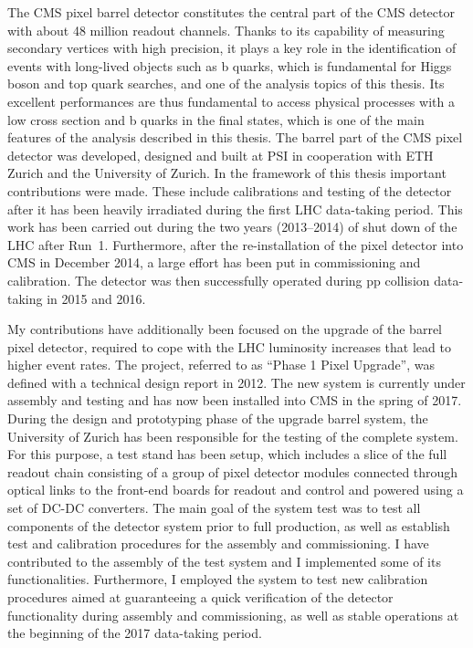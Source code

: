 The CMS pixel barrel detector constitutes the central part of the CMS detector with about 48 million readout channels. Thanks to its capability of measuring secondary vertices with high precision,
it plays a key role in the identification of events with long-lived objects such as b quarks, which is fundamental for Higgs boson and top quark searches, and one of the analysis topics of this thesis.
Its excellent performances are thus fundamental to access physical processes with a low cross section and b quarks in the final states, which is one of the main features of the analysis described in this thesis.
The barrel part of the CMS pixel detector was developed, designed and built at PSI in cooperation with ETH Zurich and the University of Zurich.
In the framework of this thesis important contributions were made. These include calibrations and testing of the detector after it has been heavily irradiated during the first LHC data-taking period.
This work has been carried out during the two years (2013--2014) of shut down of the LHC after Run~1. Furthermore, after the re-installation of the pixel detector into CMS in December 2014,
a large effort has been put in commissioning and calibration. The detector was then successfully operated during pp collision data-taking in 2015 and 2016.

My contributions have additionally been focused on the upgrade of the barrel pixel detector, required to cope with the LHC luminosity increases that lead to higher event rates.
The project, referred to as ``Phase 1 Pixel Upgrade'', was defined with a technical design report in 2012. The new system is currently under assembly and testing and has now been installed into CMS in the spring of 2017.
During the design and prototyping phase of the upgrade barrel system, the University of Zurich has been responsible for the testing of the complete system.
For this purpose, a test stand has been setup, which includes a slice of the full readout chain consisting of a group of pixel detector modules connected through optical links to the front-end boards for readout and control and powered using a set of DC-DC converters. The main goal of the system test was to test all components of the detector system prior to full production, as well as establish test and calibration procedures for the assembly and commissioning.
I have contributed to the assembly of the test system and I implemented some of its functionalities. Furthermore, I employed the system to test new calibration procedures
aimed at guaranteeing a quick verification of the detector functionality during assembly and commissioning, as well as stable operations at the beginning of the 2017 data-taking period.\\

